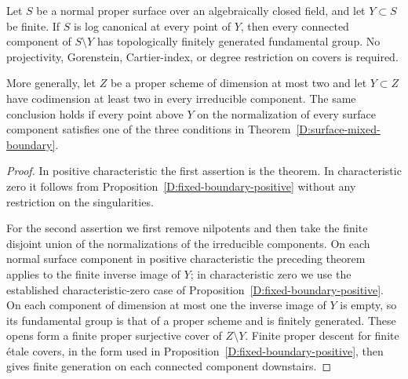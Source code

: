 \begin{corollary}
\label{D:lc-surface-boundary}
Let $S$ be a normal proper surface over an algebraically closed
field, and let $Y\subset S$ be finite.  If $S$ is log canonical
at every point of $Y$, then every connected component of
$S\setminus Y$ has topologically finitely generated fundamental
group.  No projectivity, Gorenstein, Cartier-index, or degree
restriction on covers is required.

More generally, let $Z$ be a proper scheme of dimension at most
two and let $Y\subset Z$ have codimension at least two in every
irreducible component.  The same conclusion holds if every point
above $Y$ on the normalization of every surface component
satisfies one of the three conditions in
Theorem~\ref{D:surface-mixed-boundary}.
\end{corollary}
\begin{proof}
In positive characteristic the first assertion is the theorem.
In characteristic zero it follows from
Proposition~\ref{D:fixed-boundary-positive} without any restriction
on the singularities.

For the second assertion we first remove nilpotents and then
take the finite disjoint union of the normalizations of the
irreducible components.  On each normal surface component in
positive characteristic the preceding theorem applies to the finite
inverse image of $Y$; in characteristic zero we use the established
characteristic-zero case of
Proposition~\ref{D:fixed-boundary-positive}.
On each component of dimension at most one the inverse image
of $Y$ is empty, so its fundamental group is that of a proper
scheme and is finitely generated.  These opens form a finite
proper surjective cover of $Z\setminus Y$.  Finite proper descent
for finite \'etale covers, in the form used in
Proposition~\ref{D:fixed-boundary-positive}, then gives finite
generation on each connected component downstairs.
\end{proof}
